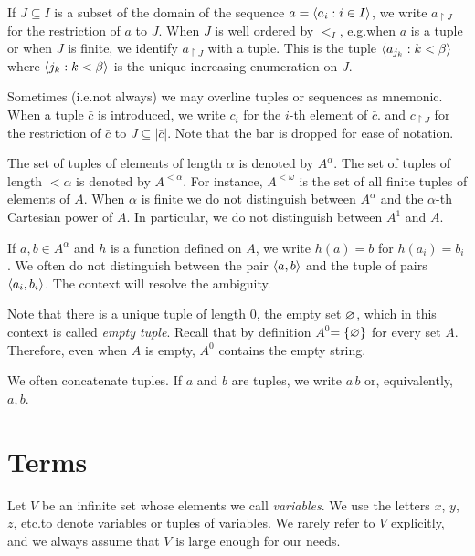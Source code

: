 If $J\subseteq I$ is a subset of the domain of the sequence $a=\langle a_i: i\in I\rangle$, we write  \emph{$a_{\restriction J}$} for the restriction of $a$ to $J$.
When $J$ is well ordered by $<_I$, e.g.\@ when $a$ is a tuple or when $J$ is finite, we identify $a_{\restriction J}$ with a tuple.
This is the tuple $\langle a_{j_k}: k<\beta\rangle$ where $\langle j_k:k<\beta\rangle$ is the unique increasing enumeration on $J$.

\noindent\llap{\textcolor{red}{\Large\danger}\kern1.5ex}Sometimes (i.e.\@ not always) we may overline tuples or sequences as mnemonic.
When a tuple $\bar c$ is introduced, we write $c_i$ for the $i$-th element of $\bar c$.
and $c_{\restriction J}$ for the restriction of $\bar c$ to $J\subseteq |\bar c|$.
Note that the bar is dropped for ease of notation.

The set of tuples of elements of length $\alpha$ is denoted by \emph{$A^\alpha$}.
The set of tuples of length $<\alpha$ is denoted by \emph{$A^{<\alpha}$}.
For instance, \emph{$A^{<\omega}$\/} is the set of all finite tuples of elements of $A$.
When $\alpha$ is finite we do not distinguish between $A^\alpha$ and the $\alpha$-th Cartesian power of $A$.
In particular, we do not distinguish between $A^1$ and $A$.

If $a,b\in A^{\alpha}$ and $h$ is a function defined on $A$, we write $h(a)=b$ for $h(a_i)=b_i$.
We often do not distinguish between the pair $\langle a,b\rangle$ and the tuple of pairs $\langle a_i,b_i\rangle$.
The context will resolve the ambiguity.

Note that there is a unique tuple of length $0$, the empty set $\varnothing$, which in this context is called \emph{empty tuple\/}.
Recall that by definition \emph{$A^{0}$\/}$=\{\varnothing\}$ for every set $A$.
Therefore, even when $A$ is empty, $A^{0}$ contains the empty string.


We often concatenate tuples.
If $a$ and $b$ are tuples, we write \emph{$a\,b$\/} or, equivalently,\ \emph{$a,b$\/}. 




\section{Terms}\label{terminidef}
Let \emph{$V$\/} be an infinite set whose elements we call \emph{variables}. We use the letters $x$, $y$, $z$, etc.\@ to denote variables or tuples of variables. We rarely refer to $V$ explicitly, and we always assume that $V$ is large enough for our needs.

